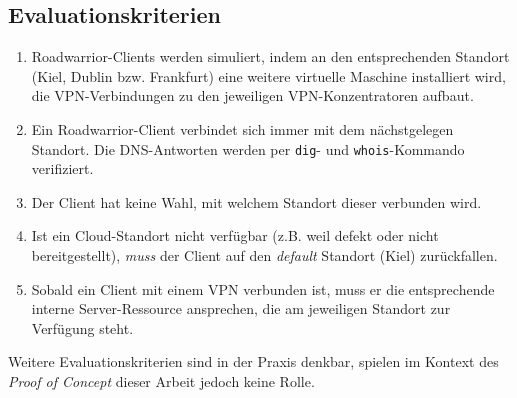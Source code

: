 \subsection{Evaluationskriterien}\label{eval-roadwarrior}
\begin{enumerate}
\item \gls{Roadwarrior}-\gls{Client}s werden simuliert, indem an den entsprechenden Standort (Kiel, Dublin bzw. Frankfurt) eine weitere virtuelle Maschine installiert wird, die \gls{VPN}-Verbindungen zu den jeweiligen \gls{VPN-Konzentrator}en aufbaut.
\item Ein \gls{Roadwarrior}-\gls{Client} verbindet sich immer mit dem nächstgelegen Standort. Die \gls{DNS}-Antworten werden per \texttt{dig}- und \texttt{whois}-Kommando verifiziert.
\item Der \gls{Client} hat keine Wahl, mit welchem Standort dieser verbunden wird.
\item Ist ein Cloud-Standort nicht verfügbar (z.B. weil defekt oder nicht bereitgestellt), \textit{muss} der \gls{Client} auf den \textit{default} Standort (Kiel) zurückfallen.
\item Sobald ein \gls{Client} mit einem \gls{VPN} verbunden ist, muss er die entsprechende interne Server-Ressource ansprechen, die am jeweiligen Standort zur Verfügung steht.
\end{enumerate}

Weitere Evaluationskriterien sind in der Praxis denkbar, spielen im Kontext des \textit{Proof of Concept} dieser Arbeit jedoch keine Rolle.
